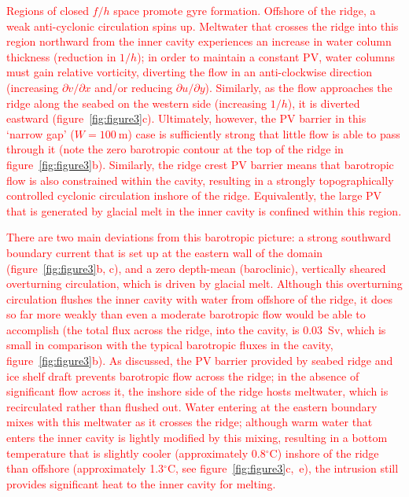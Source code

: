 \documentclass[draft]{agujournal2019}
\newcommand{\red}[1]{\textcolor{red}{#1}}
\begin{document}
\red{Regions of closed $f/h$ space promote gyre formation. Offshore of the ridge, a weak anti-cyclonic circulation spins up. Meltwater that crosses the ridge into this region northward from the inner cavity experiences an increase in water column thickness (reduction in $1/h$); in order to maintain a constant PV, water columns must gain relative vorticity, diverting the flow in an anti-clockwise direction (increasing $\partial v / \partial x$ and/or reducing $\partial u / \partial y$). Similarly, as the flow approaches the ridge along the seabed on the western side (increasing $1/h$), it is diverted eastward (figure~\ref{fig:figure3}c). Ultimately, however, the PV barrier in this `narrow gap' ($W=100~\text{m}$) case is sufficiently strong that little flow is able to pass through it (note the zero barotropic contour at the top of the ridge in figure~\ref{fig:figure3}b). Similarly, the ridge crest PV barrier means that barotropic flow is also constrained within the cavity, resulting in a strongly topographically controlled cyclonic circulation inshore of the ridge. Equivalently, the large PV that is generated by glacial melt in the inner cavity is confined within this region.}

\red{There are two main deviations from this barotropic picture: a strong southward boundary current that is set up at the eastern wall of the domain (figure~\ref{fig:figure3}b, c), and a zero depth-mean (baroclinic), vertically sheared overturning circulation, which is driven by glacial melt. Although this overturning circulation flushes the inner cavity with water from offshore of the ridge, it does so far more weakly than even a moderate barotropic flow would be able to accomplish (the total flux across the ridge, into the cavity, is 0.03~Sv, which is small in comparison with the typical barotropic fluxes in the cavity, figure~\ref{fig:figure3}b). As discussed, the PV barrier provided by seabed ridge and ice shelf draft prevents barotropic flow across the ridge; in the absence of significant flow across it, the inshore side of the ridge hosts meltwater, which is recirculated rather than flushed out. Water entering at the eastern boundary mixes with this meltwater as it crosses the ridge; although warm water that enters the inner cavity is lightly modified by this mixing, resulting in a bottom temperature that is slightly cooler (approximately 0.8${}^\circ$C) inshore of the ridge than offshore (approximately 1.3${}^\circ$C, see figure~\ref{fig:figure3}c,~e), the intrusion still provides significant heat to the inner cavity for melting.}
\end{document}
